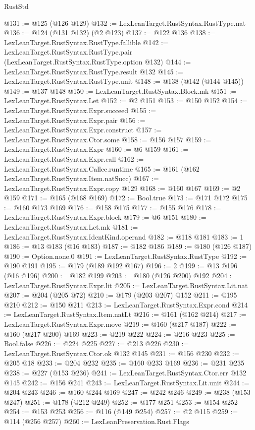 \begin{lexlean}{RustStd}
\begin{coremodule}
@131 := @125 (@126 @129)
@132 := LexLeanTarget.RustSyntax.RustType.nat
@136 := @124 (@131 @132) (@2 @123)
@137 := @122 @136
@138 := LexLeanTarget.RustSyntax.RustType.fallible
@142 := LexLeanTarget.RustSyntax.RustType.pair (LexLeanTarget.RustSyntax.RustType.option @132)
@144 := LexLeanTarget.RustSyntax.RustType.result @132
@145 := LexLeanTarget.RustSyntax.RustType.unit
@148 := @138 (@142 (@144 @145))
@149 := @137 @148
@150 := LexLeanTarget.RustSyntax.Block.mk
@151 := LexLeanTarget.RustSyntax.Let
@152 := @2 @151
@153 := @150 @152
@154 := LexLeanTarget.RustSyntax.Expr.succeed
@155 := LexLeanTarget.RustSyntax.Expr.pair
@156 := LexLeanTarget.RustSyntax.Expr.construct
@157 := LexLeanTarget.RustSyntax.Ctor.some
@158 := @156 @157
@159 := LexLeanTarget.RustSyntax.Expr
@160 := @6 @159
@161 := LexLeanTarget.RustSyntax.Expr.call
@162 := LexLeanTarget.RustSyntax.Callee.runtime
@165 := @161 (@162 LexLeanTarget.RustSyntax.Item.natSucc)
@167 := LexLeanTarget.RustSyntax.Expr.copy @129
@168 := @160 @167
@169 := @2 @159
@171 := @165 (@168 @169)
@172 := Bool.true
@173 := @171 @172
@175 := @160 @173 @169
@176 := @158 @175
@177 := @155 @176
@178 := LexLeanTarget.RustSyntax.Expr.block
@179 := @6 @151
@180 := LexLeanTarget.RustSyntax.Let.mk
@181 := LexLeanTarget.RustSyntax.IdentKind.operand
@182 := @118 @181
@183 := 1
@186 := @13 @183 (@16 @183)
@187 := @182 @186
@189 := @180 (@126 @187)
@190 := Option.none.{0}
@191 := LexLeanTarget.RustSyntax.RustType
@192 := @190 @191
@195 := @179 (@189 @192 @167)
@196 := 2
@199 := @13 @196 (@16 @196)
@200 := @182 @199
@203 := @180 (@126 @200) @192
@204 := LexLeanTarget.RustSyntax.Expr.lit
@205 := LexLeanTarget.RustSyntax.Lit.nat
@207 := @204 (@205 @72)
@210 := @179 (@203 @207) @152
@211 := @195 @210
@212 := @150 @211
@213 := LexLeanTarget.RustSyntax.Expr.cond
@214 := LexLeanTarget.RustSyntax.Item.natLt
@216 := @161 (@162 @214)
@217 := LexLeanTarget.RustSyntax.Expr.move
@219 := @160 (@217 @187)
@222 := @160 (@217 @200) @169
@223 := @219 @222
@224 := @216 @223
@225 := Bool.false
@226 := @224 @225
@227 := @213 @226
@230 := LexLeanTarget.RustSyntax.Ctor.ok @132 @145
@231 := @156 @230
@232 := @205 @18
@233 := @204 @232
@235 := @160 @233 @169
@236 := @231 @235
@238 := @227 (@153 @236)
@241 := LexLeanTarget.RustSyntax.Ctor.err @132 @145
@242 := @156 @241
@243 := LexLeanTarget.RustSyntax.Lit.unit
@244 := @204 @243
@246 := @160 @244 @169
@247 := @242 @246
@249 := @238 (@153 @247)
@251 := @178 (@212 @249)
@252 := @177 @251
@253 := @154 @252
@254 := @153 @253
@256 := @116 (@149 @254)
@257 := @2 @115
@259 := @114 (@256 @257)
@260 := LexLeanPreservation.Rust.Flags

\end{coremodule}
\end{lexlean}
